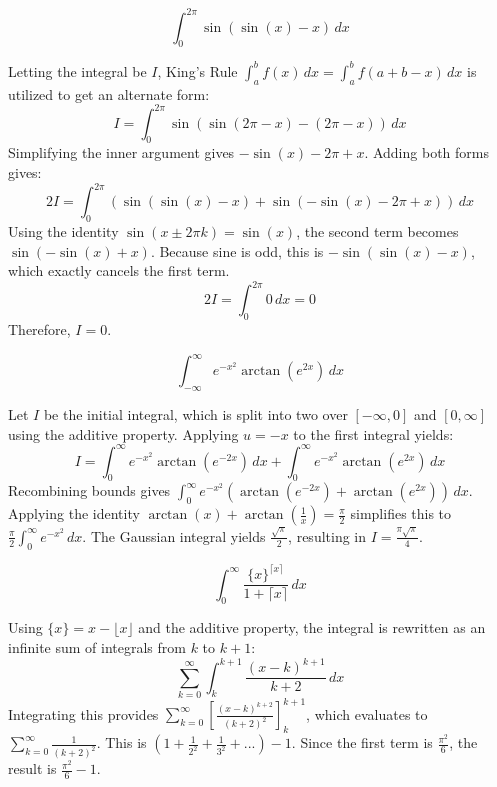 \begin{questions}
    \question \[ \int_{0}^{2\pi}\sin(\sin(x)-x) \,dx \]
    \begin{solution}
        Letting the integral be $I$, King's Rule $\int_{a}^{b}f(x) \,dx = \int_{a}^{b}f(a+b-x) \,dx$ is utilized to get an alternate form:
        \[ I = \int_{0}^{2\pi}\sin(\sin(2\pi-x)-(2\pi-x)) \,dx \]
        Simplifying the inner argument gives $-\sin(x)-2\pi+x$. Adding both forms gives:
        \[ 2I = \int_{0}^{2\pi}(\sin(\sin(x)-x)+\sin(-\sin(x)-2\pi+x)) \,dx \]
        Using the identity $\sin(x \pm 2\pi k)=\sin(x)$, the second term becomes $\sin(-\sin(x)+x)$. Because sine is odd, this is $-\sin(\sin(x)-x)$, which exactly cancels the first term.
        \[ 2I = \int_{0}^{2\pi} 0 \,dx = 0 \]
        Therefore, $I = 0$.
    \end{solution}

    \question \[ \int_{-\infty}^{\infty}e^{-x^{2}}\arctan(e^{2x}) \,dx \]
    \begin{solution}
        Let $I$ be the initial integral, which is split into two over $[-\infty, 0]$ and $[0, \infty]$ using the additive property.
        Applying $u=-x$ to the first integral yields:
        \[ I = \int_{0}^{\infty}e^{-x^{2}}\arctan(e^{-2x}) \,dx + \int_{0}^{\infty}e^{-x^{2}}\arctan(e^{2x}) \,dx \]
        Recombining bounds gives $\int_{0}^{\infty}e^{-x^{2}}(\arctan(e^{-2x})+\arctan(e^{2x})) \,dx$.
        Applying the identity $\arctan(x)+\arctan\left(\frac{1}{x}\right)=\frac{\pi}{2}$ simplifies this to $\frac{\pi}{2}\int_{0}^{\infty}e^{-x^{2}} \,dx$. The Gaussian integral yields $\frac{\sqrt{\pi}}{2}$, resulting in $I=\frac{\pi\sqrt{\pi}}{4}$.
    \end{solution}

    \question \[ \int_{0}^{\infty}\frac{\{x\}^{\lceil x\rceil}}{1+\lceil x\rceil} \,dx \]
    \begin{solution}
        Using $\{x\}=x-\lfloor x\rfloor$ and the additive property, the integral is rewritten as an infinite sum of integrals from $k$ to $k+1$:
        \[ \sum_{k=0}^{\infty}\int_{k}^{k+1}\frac{(x-k)^{k+1}}{k+2} \,dx \]
        Integrating this provides $\sum_{k=0}^{\infty} \left[ \frac{(x-k)^{k+2}}{(k+2)^{2}} \right]_{k}^{k+1}$, which evaluates to $\sum_{k=0}^{\infty}\frac{1}{(k+2)^{2}}$.
        This is $\left(1+\frac{1}{2^{2}}+\frac{1}{3^{2}}+...\right)-1$. Since the first term is $\frac{\pi^{2}}{6}$, the result is $\frac{\pi^{2}}{6}-1$.
    \end{solution}


\end{questions}
